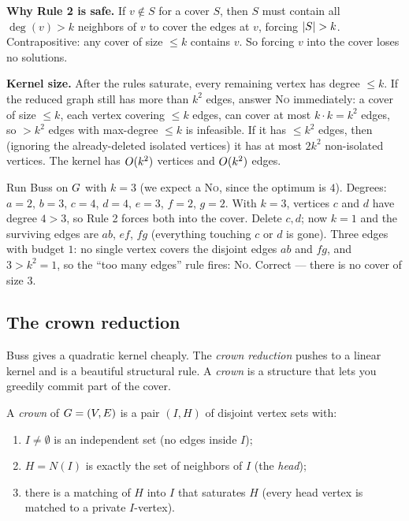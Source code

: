 \begin{whybox}
\textbf{Why Rule 2 is safe.} If $v\notin S$ for a cover $S$, then $S$ must contain all $\deg(v)>k$ neighbors of $v$ to cover the edges at $v$, forcing $\lvert S\rvert>k$. Contrapositive: any cover of size $\le k$ contains $v$. So forcing $v$ into the cover loses no solutions.

\textbf{Kernel size.} After the rules saturate, every remaining vertex has degree $\le k$. If the reduced graph still has more than $k^2$ edges, answer \textsc{No} immediately: a cover of size $\le k$, each vertex covering $\le k$ edges, can cover at most $k\cdot k=k^2$ edges, so $>k^2$ edges with max-degree $\le k$ is infeasible. If it has $\le k^2$ edges, then (ignoring the already-deleted isolated vertices) it has at most $2k^2$ non-isolated vertices. The kernel has $O(k^2)$ vertices and $O(k^2)$ edges.
\end{whybox}

\begin{labbox}
Run Buss on $G$ with $k=3$ (we expect a \textsc{No}, since the optimum is $4$). Degrees: $a{=}2$, $b{=}3$, $c{=}4$, $d{=}4$, $e{=}3$, $f{=}2$, $g{=}2$. With $k=3$, vertices $c$ and $d$ have degree $4>3$, so Rule 2 forces both into the cover. Delete $c,d$; now $k=1$ and the surviving edges are $ab$, $ef$, $fg$ (everything touching $c$ or $d$ is gone). Three edges with budget $1$: no single vertex covers the disjoint edges $ab$ and $fg$, and $3 > k^2 = 1$, so the ``too many edges'' rule fires: \textsc{No}. Correct --- there is no cover of size $3$.
\end{labbox}

\subsection{The crown reduction}

Buss gives a quadratic kernel cheaply. The \emph{crown reduction} pushes to a linear kernel and is a beautiful structural rule. A \emph{crown} is a structure that lets you greedily commit part of the cover.

\begin{definition}[Crown]\label{ch25:def-crown}
A \emph{crown} of $G=(V,E)$ is a pair $(I,H)$ of disjoint vertex sets with:
\begin{enumerate}
  \item $I\neq\emptyset$ is an independent set (no edges inside $I$);
  \item $H = N(I)$ is exactly the set of neighbors of $I$ (the \emph{head});
  \item there is a matching of $H$ into $I$ that saturates $H$ (every head vertex is matched to a private $I$-vertex).
\end{enumerate}
\end{definition}

